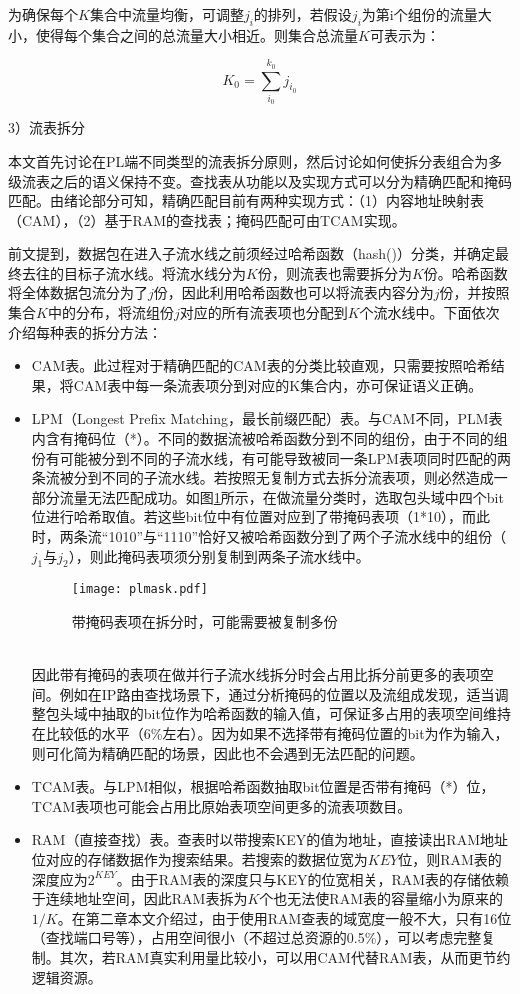 为确保每个$K$集合中流量均衡，可调整$j_i$的排列，若假设$ j_i $为第i个组份的流量大小，使得每个集合之间的总流量大小相近。则集合总流量$ K $可表示为：

\begin{equation} \label{pl1}
K_0=\sum_{i_0}^{k_0}j_{i_0}
\end{equation}

3）流表拆分

本文首先讨论在PL端不同类型的流表拆分原则，然后讨论如何使拆分表组合为多级流表之后的语义保持不变。查找表从功能以及实现方式可以分为精确匹配和掩码匹配。由绪论部分可知，精确匹配目前有两种实现方式：（1）内容地址映射表（CAM），（2）基于RAM的查找表；掩码匹配可由TCAM实现。

前文提到，数据包在进入子流水线之前须经过哈希函数（hash()）分类，并确定最终去往的目标子流水线。将流水线分为$K$份，则流表也需要拆分为$K$份。哈希函数将全体数据包流分为了$j$份，因此利用哈希函数也可以将流表内容分为$j$份，并按照集合$K$中的分布，将流组份$j$对应的所有流表项也分配到$K$个流水线中。下面依次介绍每种表的拆分方法：

\begin{itemize}
	\item CAM表。此过程对于精确匹配的CAM表的分类比较直观，只需要按照哈希结果，将CAM表中每一条流表项分到对应的K集合内，亦可保证语义正确。
	
	\item LPM（Longest Prefix Matching，最长前缀匹配）表。与CAM不同，PLM表内含有掩码位（*）。不同的数据流被哈希函数分到不同的组份，由于不同的组份有可能被分到不同的子流水线，有可能导致被同一条LPM表项同时匹配的两条流被分到不同的子流水线。若按照无复制方式去拆分流表项，则必然造成一部分流量无法匹配成功。如图\ref{fig:plmask}所示，在做流量分类时，选取包头域中四个bit位进行哈希取值。若这些bit位中有位置对应到了带掩码表项（1*10），而此时，两条流“1010”与“1110”恰好又被哈希函数分到了两个子流水线中的组份（$j_1$与$j_2$），则此掩码表项须分别复制到两条子流水线中。
	\begin{figure}[!ht]
		\centering 
		\texttt{[image: plmask.pdf]}
		\caption{带掩码表项在拆分时，可能需要被复制多份} \label{fig:plmask}
	\end{figure}
	\\因此带有掩码的表项在做并行子流水线拆分时会占用比拆分前更多的表项空间。例如在IP路由查找场景下，通过分析掩码的位置以及流组成发现，适当调整包头域中抽取的bit位作为哈希函数的输入值，可保证多占用的表项空间维持在比较低的水平（6\%左右）。因为如果不选择带有掩码位置的bit为作为输入，则可化简为精确匹配的场景，因此也不会遇到无法匹配的问题。
	\item TCAM表。与LPM相似，根据哈希函数抽取bit位置是否带有掩码（*）位，TCAM表项也可能会占用比原始表项空间更多的流表项数目。
	\item RAM（直接查找）表。查表时以带搜索KEY的值为地址，直接读出RAM地址位对应的存储数据作为搜索结果。若搜索的数据位宽为$ KEY $位，则RAM表的深度应为$2^{KEY}$。由于RAM表的深度只与KEY的位宽相关，RAM表的存储依赖于连续地址空间，因此RAM表拆为$ K $个也无法使RAM表的容量缩小为原来的$1/K$。在第二章本文介绍过，由于使用RAM查表的域宽度一般不大，只有16位（查找端口号等），占用空间很小（不超过总资源的0.5\%），可以考虑完整复制。其次，若RAM真实利用量比较小，可以用CAM代替RAM表，从而更节约逻辑资源。
\end{itemize}

